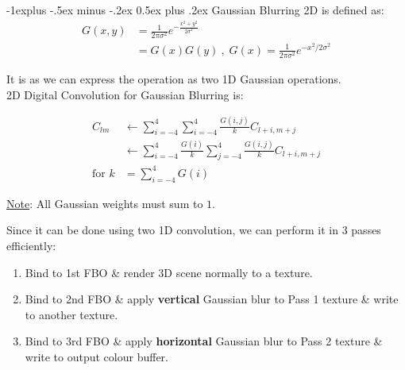 \documentclass[10pt,landscape,letterpaper]{article}
\makeatletter
\renewcommand{\subsection}{\@startsection{subsection}{2}{0mm}%
                                {-1explus -.5ex minus -.2ex}%
                                {0.5ex plus .2ex}%
                                {\sffamily\normalsize\itshape}}
\makeatother
\begin{document}
\begin{multicols}{3}
\subsection{Gaussian Blurring}
2D  is defined as:
\[
\begin{aligned}
G(x, y) &= \frac{1}{2\pi\sigma^2} e^{-\frac{x^2+y^2}{2\sigma^2}}
\\
&= G(x)G(y) \ , \; G(x) = \frac{1}{2\pi\sigma^2} e^{-x^2/2\sigma^2}
\end{aligned}
\]

It is  as we can express the operation as two 1D Gaussian operations.
\\
2D Digital Convolution for Gaussian Blurring is:

\[
\begin{aligned}
C_{lm} 
& \leftarrow \sum_{i=-4}^{4} \sum_{i=-4}^{4} \frac{G(i,j)}{k} C_{l+i, m+j}
\\
& \leftarrow \sum_{i=-4}^{4} \frac{G(i)}{k} \sum_{j=-4}^{4} \frac{G(i,j)}{k} C_{l+i, m+j}
\\
\text{for } k &= \sum_{i=-4}^4 G(i)
\end{aligned}
\]

\underline{Note}: All Gaussian weights must sum to $1$.

Since it can be done using two 1D convolution, we can perform it in 3 passes efficiently:
\begin{enumerate}
    \item Bind to 1st FBO \& render 3D scene normally to a texture.
    \item Bind to 2nd FBO \& apply \textbf{vertical} Gaussian blur to Pass 1 texture \& write to another texture.
    \item Bind to 3rd FBO \& apply \textbf{horizontal} Gaussian blur to Pass 2 texture \& write to output colour buffer.
\end{enumerate}






\end{multicols}
\end{document}
